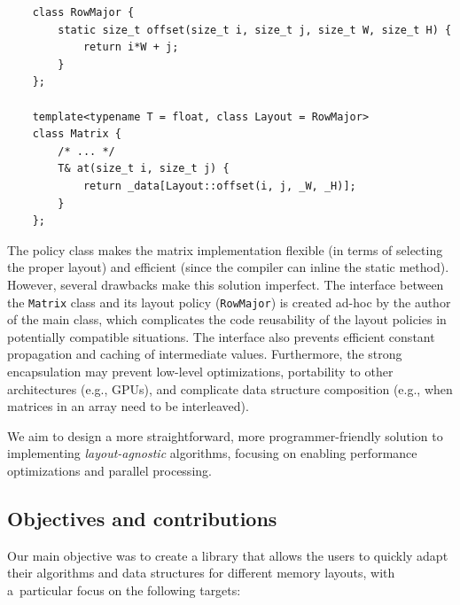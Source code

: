 \begin{verbatim}
    class RowMajor {
        static size_t offset(size_t i, size_t j, size_t W, size_t H) {
            return i*W + j;  
        }
    };

    template<typename T = float, class Layout = RowMajor>
    class Matrix {
        /* ... */
        T& at(size_t i, size_t j) {
            return _data[Layout::offset(i, j, _W, _H)];
        }
    };
\end{verbatim}
  
The policy class makes the matrix implementation flexible (in terms of selecting the proper layout) and efficient (since the compiler can inline the static method). However, several drawbacks make this solution imperfect. The interface between the \texttt{Matrix} class and its layout policy (\texttt{RowMajor}) is created ad-hoc by the author of the main class, which complicates the code reusability of the layout policies in potentially compatible situations. The interface also prevents efficient constant propagation and caching of intermediate values. Furthermore, the strong encapsulation may prevent low-level optimizations, portability to other architectures (e.g., GPUs), and complicate data structure composition (e.g., when matrices in an array need to be interleaved).

We aim to design a more straightforward, more programmer-friendly solution to implementing \emph{layout-agnostic} algorithms, focusing on enabling performance optimizations and parallel processing.


\subsection{Objectives and contributions}

Our main objective was to create a library that allows the users to quickly adapt their algorithms and data structures for different memory layouts, with a~particular focus on the following targets:

